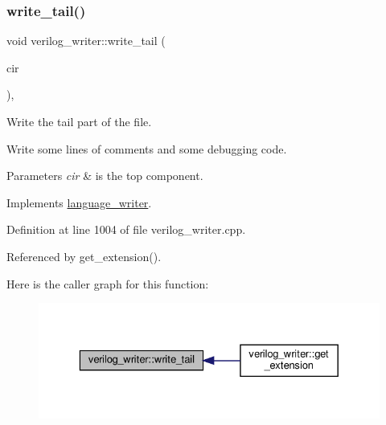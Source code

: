 \subsubsection{\texorpdfstring{write\+\_\+tail()}{write\_tail()}}
{\footnotesize\ttfamily void verilog\+\_\+writer\+::write\+\_\+tail (\begin{DoxyParamCaption}\item[{const \hyperlink{structural__objects_8hpp_a8ea5f8cc50ab8f4c31e2751074ff60b2}{structural\+\_\+object\+Ref} \&}]{cir }\end{DoxyParamCaption})\hspace{0.3cm}{\ttfamily [override]}, {\ttfamily [virtual]}}



Write the tail part of the file. 

Write some lines of comments and some debugging code. 
\begin{DoxyParams}{Parameters}
{\em cir} & is the top component. \\
\hline
\end{DoxyParams}


Implements \hyperlink{classlanguage__writer_aa244ceb9a8c0033a75c5b885df4693c8}{language\+\_\+writer}.



Definition at line 1004 of file verilog\+\_\+writer.\+cpp.



Referenced by get\+\_\+extension().

Here is the caller graph for this function\+:
\nopagebreak
\begin{figure}[H]
\begin{center}
\leavevmode
\includegraphics[width=329pt]{d8/dba/classverilog__writer_ab65a214d6736e0fa5de6f2d5d085227f_icgraph}
\end{center}
\end{figure}
\mbox{\label{classverilog__writer_a19adf1be19b905787d523ecbf8e654aa}} 
